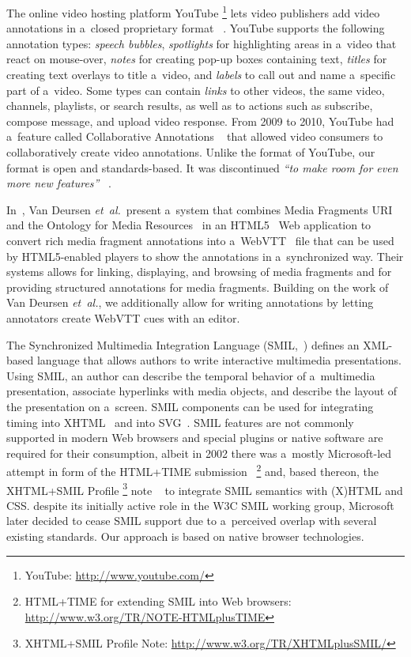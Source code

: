\documentclass[runningheads,a4paper]{llncs}
\newcommand{\inlinelistingsize}{\fontsize{8pt}{11pt}}
\let\oldurl\url
\renewcommand{\url}[1]{\inlinelistingsize\oldurl{#1}}
\begin{document}
The online video hosting platform YouTube%
\footnote{YouTube: \url{http://www.youtube.com/}}
lets video publishers add video annotations
in a~closed proprietary format%
~\cite{youtube2008annotations,youtube2010annotations}.
YouTube supports the following
annotation types: \emph{speech bubbles},
\emph{spotlights} for highlighting areas in a~video
that react on mouse-over,
\emph{notes} for creating pop-up boxes containing text,
\emph{titles} for creating text overlays to title a~video,
and \emph{labels} to call out
and name a~specific part of a~video.
Some types can contain \emph{links}
to other videos, the same video, channels, playlists,
or search results, as well as to actions
such as subscribe, compose message, and upload video response.
From 2009 to 2010, YouTube had a~feature called
Collaborative Annotations%
~\cite{fink2009collaborativeannotations}
that allowed video consumers to collaboratively
create video annotations.
Unlike the format of YouTube, our format is open and standards-based.
It was discontinued \textit{``to make room for even more new features''}%
~\cite{youtube2010annotations}.

In~\cite{vandeursen2012mediafragmentannotations},
Van Deursen \emph{et~al.}\ present a~system
that combines Media Fragments URI~\cite{troncy2012mediafragments}
and the Ontology for Media Resources~\cite{lee2012mediaontology}
in an HTML5~\cite{berjon2013html5}
Web application to convert rich media fragment annotations
into a~WebVTT~\cite{pfeiffer2013webvtt} file
that can be used by HTML5-enabled players
to show the annotations in a~synchronized way.
Their systems allows for linking, displaying, and
browsing of media fragments and
for providing structured annotations for media fragments.
Building on the work of Van Deursen \emph{et~al.},
we additionally allow for writing annotations by
letting annotators create WebVTT cues with an editor.

The Synchronized Multimedia Integration Language
(SMIL,~\cite{bulterman2006smil})
defines an XML-based language that allows authors
to write interactive multimedia presentations.
Using SMIL, an author can describe the temporal behavior
of a~multimedia presentation, associate hyperlinks
with media objects, and describe the layout
of the presentation on a~screen.
SMIL components can be used for integrating timing
into XHTML~\cite{pemberton2002xhtml}
and into SVG~\cite{ferraiolo2003svg}.
SMIL features are not commonly supported
in modern Web browsers and special plugins or native software
are required for their consumption,
albeit in 2002 there was a~mostly Microsoft-led attempt
in form of the HTML+TIME submission~\cite{schmitz1998htmltime}
\footnote{HTML+TIME for extending SMIL into Web browsers: \url{http://www.w3.org/TR/NOTE-HTMLplusTIME}}
and, based thereon, the XHTML+SMIL Profile%
\footnote{XHTML+SMIL Profile Note:
\url{http://www.w3.org/TR/XHTMLplusSMIL/}} note
~\cite{newman2002xhtmlsmil}
to integrate SMIL semantics with (X)HTML and CSS.
despite its initially active role in the W3C SMIL working group,
Microsoft later decided to cease SMIL support
due to a~perceived overlap with several existing standards.
Our approach is based on native browser technologies.
\end{document}
